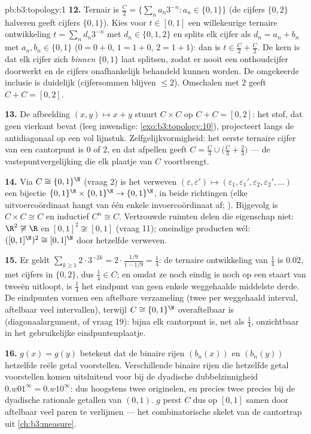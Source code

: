 \begin{solution}{pb:b3:topology:1}
\textbf{12.} Ternair is $\frac C2 = \{\sum_na_n3^{-n} : a_n \in
\{0, 1\}\}$ (de cijfers $\{0,2\}$ halveren geeft cijfers
$\{0,1\}$). Kies voor $t \in [0,1]$ een willekeurige ternaire
ontwikkeling $t = \sum_nd_n3^{-n}$ met $d_n \in \{0,1,2\}$ en
splits elk cijfer als $d_n = a_n + b_n$ met $a_n, b_n \in \{0,1\}$
($0 = 0{+}0$, $1 = 1{+}0$, $2 = 1{+}1$): dan is $t \in \frac C2 +
\frac C2$. De kern is dat elk cijfer zich \emph{binnen} $\{0,1\}$
laat splitsen, zodat er nooit een onthoudcijfer doorwerkt en de
cijfers onafhankelijk behandeld kunnen worden. De omgekeerde
inclusie is duidelijk (cijfersommen blijven $\leq 2$). Omschalen
met $2$ geeft $C + C = [0,2]$.

\textbf{13.} De afbeelding $(x, y) \mapsto x + y$ stuurt $C \times
C$ op $C + C = [0,2]$: het stof, dat geen vierkant bevat (leeg
inwendige: \cref{exo:b3:topology:10}), projecteert langs de
antidiagonaal op een vol lijnstuk. Zelfgelijkvormigheid: het
eerste ternaire cijfer van een cantorpunt is $0$ of $2$, en dat
afpellen geeft $C = \frac C3 \cup \bigl(\frac C3 + \frac23\bigr)$
--- de vastepuntvergelijking die elk plaatje van $C$ voortbrengt.

\textbf{14.} Via $C \cong \{0,1\}^\N$ (vraag 2) is het verweven
$(\varepsilon, \varepsilon') \mapsto (\varepsilon_1,
\varepsilon_1', \varepsilon_2, \varepsilon_2', \dots)$ een
bijectie $\{0,1\}^\N\times\{0,1\}^\N \to \{0,1\}^\N$, in beide
richtingen  (elke uitvoercoördinaat hangt van één enkele
invoercoördinaat af; ). Bijgevolg is $C\times C
\cong C$ en inductief $C^n \cong C$. Vertrouwde ruimten delen die
eigenschap niet: $\R^2 \not\cong \R$ en $[0,1]^2 \not\cong [0,1]$
(vraag 11); oneindige producten wél: $([0,1]^\N)^2 \cong
[0,1]^\N$ door hetzelfde verweven.

\textbf{15.} Er geldt $\sum_{k\geq1}2\cdot3^{-2k} =
2\cdot\frac{1/9}{1 - 1/9} = \frac14$: de ternaire ontwikkeling van
$\frac14$ is $0.\overline{02}$, met cijfers in $\{0,2\}$, dus
$\frac14 \in C$; en omdat ze noch eindig is noch op een staart van
tweeën uitloopt, is $\frac14$ het eindpunt van geen enkele
weggehaalde middelste derde. De eindpunten vormen een aftelbare
verzameling (twee per weggehaald interval, aftelbaar veel
intervallen), terwijl $C \cong \{0,1\}^\N$ overaftelbaar is
(diagonaalargument, of vraag 19): bijna elk cantorpunt is, net als
$\frac14$, onzichtbaar in het gebruikelijke eindpuntenplaatje.

\textbf{16.} $g(x) = g(y)$ betekent dat de binaire rijen
$(b_n(x))$ en $(b_n(y))$ hetzelfde reële getal voorstellen.
Verschillende binaire rijen die hetzelfde getal voorstellen komen
uitsluitend voor bij de dyadische dubbelzinnigheid $0.w01^\infty =
0.w10^\infty$: dus hoogstens twee originelen, en precies twee
precies bij de dyadische rationale getallen van $(0,1)$. $g$
perst $C$ dus op $[0,1]$ samen door aftelbaar veel paren te
verlijmen --- het combinatorische skelet van de cantortrap uit
\cref{ch:b3:measure}.


\end{solution}
